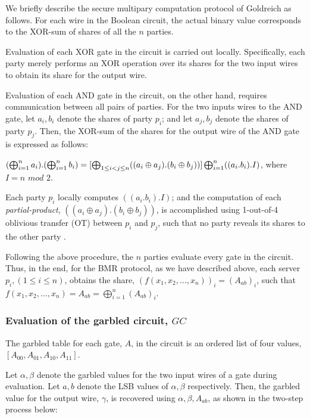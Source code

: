 \documentclass[10pt,journal,cspaper,compsoc]{IEEEtran}
\begin{document}
We briefly describe the secure multipary computation protocol of Goldreich \cite{goldreich04,goldreich87} as follows. For each wire in the Boolean circuit, the actual binary value corresponds to the XOR-sum of shares of all the $n$ parties.


Evaluation of each XOR gate in the circuit is carried out locally. Specifically, each party merely performs an XOR operation over its shares for the two input wires to obtain its share for the output wire.


Evaluation of each AND gate in the circuit, on the other hand, requires communication between all pairs of parties. For the two inputs wires to the AND gate, let $a_i, b_i$ denote the shares of party $p_i$; and let $a_j, b_j$ denote the shares of party $p_j$. Then, the XOR-sum of the shares for the output wire of the AND gate is expressed as follows:

$(\bigoplus_{i=1}^{n} a_i).(\bigoplus_{i=1}^{n} b_i)=[\bigoplus_{1\le i<j\le n} ((a_i\oplus a_j).(b_i\oplus b_j))]\\\bigoplus_{i=1}^{n} ((a_i.b_i).I)$, where $I=n$ $mod$ $2$.


Each party $p_i$ locally computes $((a_i.b_i).I)$; and the computation of each {\em partial-product}, $((a_i\oplus a_j).(b_i\oplus b_j))$, is accomplished using 1-out-of-4 oblivious transfer (OT) between $p_i$ and $p_j$, such that no party reveals its shares to the other party \cite{goldreich04,goldreich87}.


Following the above procedure, the $n$ parties evaluate every gate in the circuit. Thus, in the end, for the BMR protocol, as we have described above,  each server $p_i, (1\le i\le n)$, obtains the share, $(f(x_1, x_2, \ldots, x_n))_i = (A_{ab})_i$, such that $f(x_1, x_2, \ldots, x_n)=A_{ab}=\bigoplus_{i=1}^{n}(A_{ab})_i$.


\subsubsection{Evaluation of the garbled circuit, $GC$}
\label{sec_garbled_circuit_BMR_evaluation}

The garbled table for each gate, $A$, in the circuit is an ordered list of four values, $[A_{00}, A_{01}, A_{10}, A_{11}]$.


Let $\alpha, \beta$ denote the garbled values for the two input wires of a gate during evaluation. Let $a, b$ denote the LSB values of $\alpha, \beta$ respectively. Then, the garbled value for the output wire, $\gamma$, is recovered using $\alpha, \beta, A_{ab}$, as shown in the two-step process below:
\end{document}
